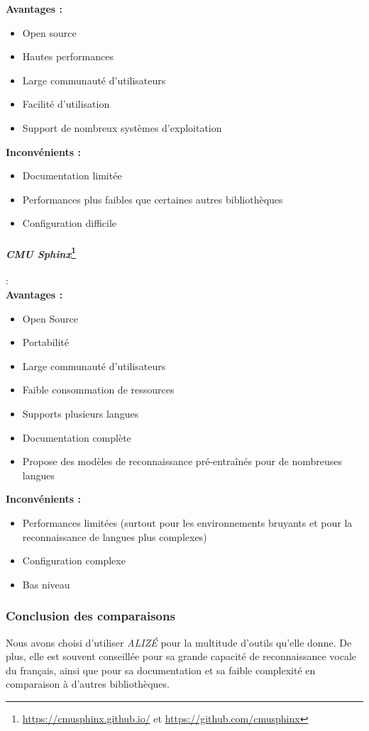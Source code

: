 \textbf{Avantages :}
\begin{itemize}
    \item Open source
    \item Hautes performances
    \item Large communauté d'utilisateurs
    \item Facilité d'utilisation
    \item Support de nombreux systèmes d'exploitation
\end{itemize}

\textbf{Inconvénients :}
\begin{itemize}
    \item Documentation limitée
    \item Performances plus faibles que certaines autres bibliothèques
    \item Configuration difficile
\end{itemize}

\paragraph*{\textbf{\textit{CMU Sphinx}}\footnote{\url{https://cmusphinx.github.io/} et \url{https://github.com/cmusphinx}}}: \\

\textbf{Avantages :}
\begin{itemize}
    \item Open Source
    \item Portabilité
    \item Large communauté d'utilisateurs
    \item Faible consommation de ressources
    \item Supports plusieurs langues
    \item Documentation complète
    \item Propose des modèles de reconnaissance pré-entraînés pour de nombreuses langues
\end{itemize}

\textbf{Inconvénients :}
\begin{itemize}
    \item Performances limitées (surtout pour les environnements bruyants et pour la reconnaissance de langues plus complexes)
    \item Configuration complexe
    \item Bas niveau
\end{itemize}

\subsubsection*{Conclusion des comparaisons}

Nous avons choisi d'utiliser \textit{ALIZÉ} pour la multitude d'outils qu'elle donne. De plus, elle est souvent conseillée pour sa grande capacité de reconnaissance vocale du français, ainsi que pour sa documentation et sa faible complexité en comparaison à d'autres bibliothèques.



